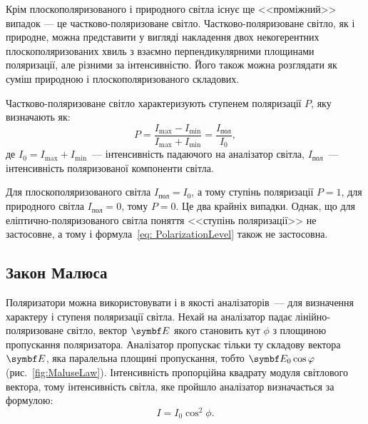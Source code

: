Крім плоскополяризованого і природного світла існує ще <<проміжний>> випадок ---
це частково-поляризоване світло. Частково-поляризоване світло, як і природне, можна представити у вигляді накладення
двох некогерентних плоскополяризованих хвиль з взаємно перпендикулярними площинами поляризації, але різними за інтенсивністю. Його також можна розглядати як суміш природною  і плоскополяризованого складових.

Частково-поляризоване світло характеризують ступенем поляризації $P$, яку визначають як:
\begin{equation}\label{eq: PolarizationLevel}
    P = \frac{I_{\max} - I_{\min}}{I_{\max} + I_{\min}} = \frac{I_\text{пол}}{I_0},
\end{equation}
де $I_0 = I_{\max} + I_{\min}$~--- інтенсивність падаючого на аналізатор світла, $I_\text{пол}$~--- інтенсивність поляризованої компоненти світла. 

Для плоскополяризованого світла $I_\text{пол} = I_0$, а тому ступінь поляризації $P = 1$, для природного світла $I_\text{пол} = 0$, тому  $P = 0$. Це два крайніх випадки. Однак,  що для еліптично-поляризованого світла поняття <<ступінь поляризації>> не застосовне, а тому і формула~\eqref{eq: PolarizationLevel} також не застосовна.

\subsection{Закон Малюса}

Поляризатори можна використовувати і в якості аналізаторів~--- для визначення характеру і ступеня поляризації світла.
Нехай на аналізатор падає лінійно-поляризоване світло, вектор $\Efield$ якого становить кут $\phi$ з площиною пропускання
поляризатора. Аналізатор пропускає тільки ту складову вектора $\Efield$, яка паралельна площині пропускання, тобто $\Efield_0 \cos\phi$ (рис.~\ref{fig:MaluseLaw}). Інтенсивність пропорційна квадрату модуля світлового вектора, тому інтенсивність світла, яке пройшло аналізатор визначається за формулою:
\begin{equation}\label{eq:MaluseLow}
    I = I_0\cos^2\phi.
\end{equation}

